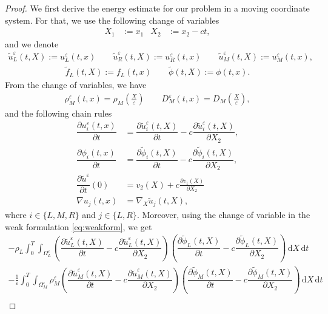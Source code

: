 \documentclass[11pt]{article}
\def\es{\varepsilon}
\def\omm{\Omega_M^\varepsilon}
\def\oll{\Omega_L^\varepsilon}
\def\p{\partial}
\newcommand{\di}[1]{\,\mathrm{d}#1}
\begin{document}
	\begin{proof}
	We first derive the energy estimate for our problem in a moving coordinate system. For that, we use the following change of variables 
	\begin{align*}
	    X_1&:=x_1 & X_2&:=x_2-ct, 
	\end{align*}
	and we denote
    \begin{align*}
        \widetilde{u}_{L}^\es(t,X):={u}_{L}^\es(t,x)\qquad \widetilde{u}_{R}^\es(t,X):={u}_{R}^\es(t,x) \qquad \widetilde{u}_{M}^\es(t,X):={u}_{M}^\es(t,x),
    \end{align*}
    \begin{align*}
        \widetilde{f}_L(t,X):=f_L(t,x) \qquad \widetilde{\phi}(t,X):=\phi(t,x).
    \end{align*}
    From the change of variables, we have 
    \begin{align*}
        \rho_M^\es(t,x)=\rho_M(\tfrac{X}{\es})\qquad  D_M^\es(t,x)=D_M(\tfrac{X}{\es}),
    \end{align*}    
  and  the following chain rules
	\begin{align*}
	    \dfrac{\partial u_{i}^\es(t,x)}{\partial t}&=\dfrac{\partial \widetilde{u}_{i}^\es(t,X)}{\partial t}-c\dfrac{\partial \widetilde{u}_{i}^\es(t,X)}{\partial{X_2}},\\
        \dfrac{\partial \phi_{i}(t,x)}{\partial t}&=\dfrac{\partial \widetilde{\phi}_{i}(t,X)}{\partial t}-c\dfrac{\partial \widetilde{\phi}_{i}(t,X)}{\partial{X_2}},\\ 
        \dfrac{\partial \widetilde{u}^\es}{\partial t}(0)&=v_2(X)+c\frac{\p v_1(X)}{\p X_2}\\
	    \nabla u_{j}(t,x)&=\nabla_X\widetilde{u}_{j}(t,X),
	\end{align*}
 where $i\in\{L,M,R\}$ and $j\in\{L,R\}$.  
Moreover, using the change of variable in the weak formulation \eqref{eq:weakform}, we get
\begin{multline*}
    -\rho_L\int_0^T\int_{\oll} \left(\dfrac{\partial \widetilde{u}_{L}^\es(t,X)}{\partial t}-c\dfrac{\partial \widetilde{u}_{L}^\es(t,X)}{\partial{X_2}}\right)\left(\dfrac{\partial \widetilde{\phi}_{L}(t,X)}{\partial t}-c\dfrac{\partial \widetilde{\phi}_{L}(t,X)}{\partial{X_2}}\right)\di{X\di{t}}\\
     -\frac{1}{\es}\int_0^T\int_{\omm} \rho_M^\es \left(\dfrac{\partial \widetilde{u}_{M}^\es(t,X)}{\partial t}-c\dfrac{\partial \widetilde{u}_{M}^\es(t,X)}{\partial{X_2}}\right)\left(\dfrac{\partial \widetilde{\phi}_{M}(t,X)}{\partial t}-c\dfrac{\partial \widetilde{\phi}_{M}(t,X)}{\partial{X_2}}\right)\di{X\di{t}}\\

\end{multline*}
\end{proof}
\end{document}
